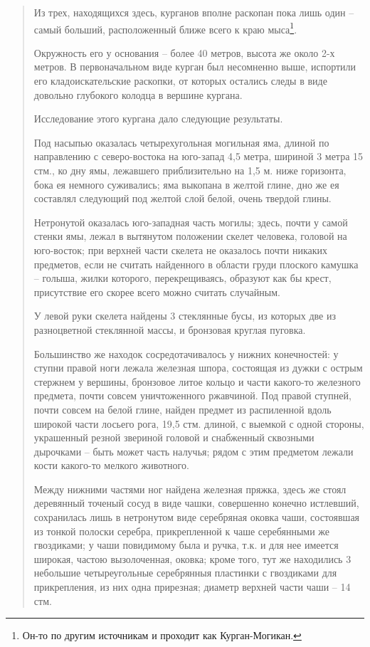 \begin{quotation}
Из трех, находящихся здесь, курганов вполне раскопан пока лишь один – самый больший, расположенный ближе всего к краю мыса\footnote{Он-то по другим источникам и проходит как Курган-Могикан.}.

Окружность его у основания – более 40 метров, высота же около 2-х метров. В первоначальном виде курган был несомненно выше, испортили его кладоискательские раскопки, от которых остались следы в виде довольно глубокого колодца в вершине кургана.

Исследование этого кургана дало следующие результаты.

Под насыпью оказалась четырехугольная могильная яма, длиной по направлению с севе\-ро-востока на юго-запад 4,5 метра, шириной 3 метра 15 стм., ко дну ямы, лежавшего приблизительно на 1,5 м. ниже горизонта, бока ея немного суживались; яма выкопана в желтой глине, дно же ея составлял следующий под желтой слой белой, очень твердой глины. 

Нетронутой оказалась юго-западная часть могилы; здесь, почти у самой стенки ямы, лежал в вытянутом положении скелет человека, головой на юго-восток; при верхней части скелета не оказалось почти никаких предметов, если не считать найденного в области груди плоского камушка – голыша, жилки которого, перекрещиваясь, образуют как бы крест, присутствие его скорее всего можно считать случайным.

У левой руки скелета найдены 3 стеклянные бусы, из которых две из разноцветной стеклянной массы, и бронзовая круглая пуговка.

Большинство же находок сосредотачивалось у нижних конечностей: у ступни правой ноги лежала железная шпора, состоящая из дужки с острым стержнем у вершины, бронзовое литое кольцо и части какого-то железного предмета, почти совсем уничтоженного ржавчиной. Под правой ступней, почти совсем на белой глине, найден предмет из распиленной вдоль широкой части лосьего рога, 19,5 стм. длиной, с выемкой с одной стороны, украшенный резной звериной головой и снабженный сквозными дырочками – быть может часть налучья; рядом с этим предметом лежали кости какого-то мелкого животного.

Между нижними частями ног найдена железная пряжка, здесь же стоял деревянный точеный сосуд в виде чашки, совершенно конечно истлевший, сохранилась лишь в нетронутом виде серебряная оковка чаши, состоявшая из тонкой полоски серебра, прикрепленной к чаше серебянными же гвоздиками; у чаши повидимому была и ручка, т.к. и для нее имеется широкая, частою вызолоченная, оковка; кроме того, тут же находились 3 небольшие четыреугольные серебрянныя пластинки с гвоздиками для прикрепления, из них одна прирезная; диаметр верхней части чаши – 14 стм.


\end{quotation}
